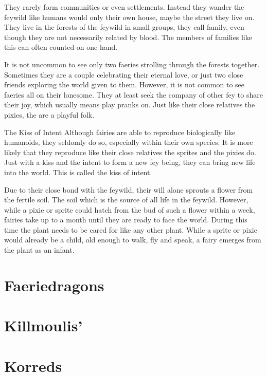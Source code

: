 \documentclass[letter,10pt,twocolumn,openany]{dndbook}
\begin{document}
They rarely form communities or even settlements.
Instead they wander the feywild like humans would only their own house, maybe the street they live on.
They live in the forests of the feywild in small groups, they call family, even though they are not necessarily related by blood.
The members of families like this can often counted on one hand.

It is not uncommon to see only two faeries strolling through the forests together.
Sometimes they are a couple celebrating their eternal love, or just two close friends exploring the world given to them.
However, it is not common to see faeries all on their lonesome.
They at least seek the company of other fey to share their joy, which usually means play pranks on.
Just like their close relatives the pixies, the are a playful folk.

\begin{DndComment}{The Kiss of Intent}
  Although fairies are able to reproduce biologically like humanoids, they seldomly do so, especially within their own species.
  It is more likely that they reproduce like their close relatives the sprites and the pixies do.
  Just with a kiss and the intent to form a new fey being, they can bring new life into the world.
  This is called the kiss of intent.

  Due to their close bond with the feywild, their will alone sprouts a flower from the fertile soil.
  The soil which is the source of all life in the feywild.
  However, while a pixie or sprite could hatch from the bud of such a flower within a week, fairies take up to a month until they are ready to face the world.
  During this time the plant needs to be cared for like any other plant.
  While a sprite or pixie would already be a child, old enough to walk, fly and speak, a fairy emerges from the plant as an infant.
\end{DndComment}

\section{Faeriedragons} %

\section{Killmoulis'}

\section{Korreds}
\end{document}

